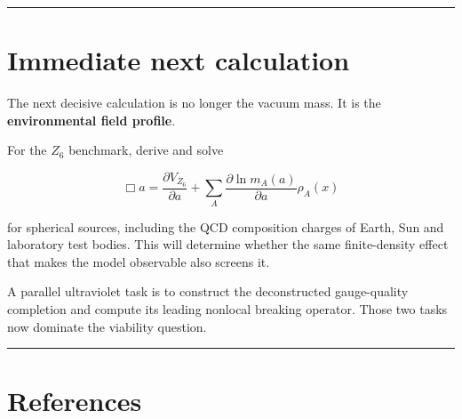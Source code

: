 \documentclass[11pt,a4paper]{article}
\begin{document}
\begin{center}\rule{0.5\linewidth}{0.5pt}\end{center}

\section{Immediate next calculation}\label{immediate-next-calculation}

The next decisive calculation is no longer the vacuum mass. It is the
\textbf{environmental field profile}.

For the \(Z_6\) benchmark, derive and solve

\[
\Box a
=
\frac{\partial V_{Z_6}}{\partial a}
+\sum_A
\frac{\partial\ln m_A(a)}{\partial a}\rho_A(x)
\]

for spherical sources, including the QCD composition charges of Earth,
Sun and laboratory test bodies. This will determine whether the same
finite-density effect that makes the model observable also screens it.

A parallel ultraviolet task is to construct the deconstructed
gauge-quality completion and compute its leading nonlocal breaking
operator. Those two tasks now dominate the viability question.

\begin{center}\rule{0.5\linewidth}{0.5pt}\end{center}

\section{References}\label{references}
\end{document}
